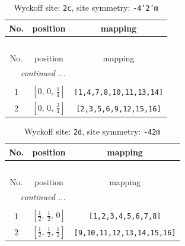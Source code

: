 \documentclass[fleqn,8pt]{jsarticle}
\begin{document}
\renewcommand{\arraystretch}{1.2}
\begin{longtable}{ccc}
\caption{Wyckoff site: {\tt 2c}, site symmetry: {\tt -4'2'm}}
 \\
 \hline \hline
No. & position & mapping \\ \hline \endfirsthead

\multicolumn{2}{l}{\tablename\ \thetable{}} \\
 \hline \hline
No. & position & mapping \\ \hline \endhead

 \hline \hline
\multicolumn{2}{r}{\footnotesize\it continued ...} \\ \endfoot

 \hline \hline
\multicolumn{2}{r}{} \\ \endlastfoot

1 & $\left[ 0,\, 0,\, \frac{1}{4} \right]$ & {\tt [1,4,7,8,10,11,13,14]} \\ \hline
2 & $\left[ 0,\, 0,\, \frac{3}{4} \right]$ & {\tt [2,3,5,6,9,12,15,16]} \\
\end{longtable}
\renewcommand{\arraystretch}{1.2}
\begin{longtable}{ccc}
\caption{Wyckoff site: {\tt 2d}, site symmetry: {\tt -42m}}
 \\
 \hline \hline
No. & position & mapping \\ \hline \endfirsthead

\multicolumn{2}{l}{\tablename\ \thetable{}} \\
 \hline \hline
No. & position & mapping \\ \hline \endhead

 \hline \hline
\multicolumn{2}{r}{\footnotesize\it continued ...} \\ \endfoot

 \hline \hline
\multicolumn{2}{r}{} \\ \endlastfoot

1 & $\left[ \frac{1}{2},\, \frac{1}{2},\, 0 \right]$ & {\tt [1,2,3,4,5,6,7,8]} \\ \hline
2 & $\left[ \frac{1}{2},\, \frac{1}{2},\, \frac{1}{2} \right]$ & {\tt [9,10,11,12,13,14,15,16]} \\
\end{longtable}
\renewcommand{\arraystretch}{1.2}
\end{document}
